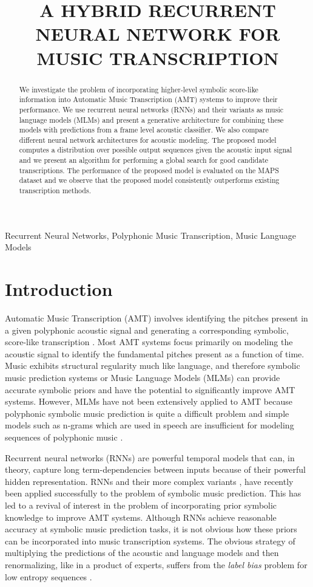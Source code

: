 \documentclass{article}
\title{A HYBRID RECURRENT NEURAL NETWORK FOR MUSIC TRANSCRIPTION}
\begin{document}
\ninept
%
\maketitle
%
\begin{abstract}
We investigate the problem of incorporating higher-level symbolic score-like information into Automatic Music Transcription (AMT) systems to improve their performance. We use recurrent neural networks (RNNs) and their variants as music language models (MLMs) and present a generative architecture for combining these models with predictions from a frame level acoustic classifier. We also compare different neural network architectures for acoustic modeling. The proposed model computes a distribution over possible output sequences given the acoustic input signal and we present an algorithm for performing a global search for good candidate transcriptions. The performance of the proposed model is evaluated on the MAPS dataset and we observe that the proposed model consistently outperforms existing transcription methods. 
\end{abstract}
%
\begin{keywords}
Recurrent Neural Networks, Polyphonic Music Transcription, Music Language Models
\end{keywords}
%
\section{Introduction}
\label{sec:intro} 

Automatic Music Transcription (AMT) involves identifying the pitches present in a given polyphonic acoustic signal and generating a corresponding symbolic, score-like transcription \cite{Klapuri06book}. Most AMT systems focus primarily on modeling the acoustic signal to identify the fundamental pitches present as a function of time. Music exhibits structural regularity much like language, and therefore symbolic music prediction systems or Music Language Models (MLMs) can provide accurate symbolic priors and have the potential to significantly improve AMT systems. However, MLMs have not been extensively applied to AMT because polyphonic symbolic music prediction is quite a difficult problem and simple models such as n-grams which are used in speech are insufficient for modeling sequences of polyphonic music \cite{boulanger2012modeling}. 

Recurrent neural networks (RNNs) are powerful temporal models that can, in theory, capture long term-dependencies between inputs because of their powerful hidden representation. RNNs and their more complex variants \cite{boulanger2012modeling}, have recently been applied successfully to the problem of symbolic music prediction. This has led to a revival of interest in the problem of incorporating prior symbolic knowledge to improve AMT systems. Although RNNs achieve reasonable accuracy at symbolic music prediction tasks, it is not obvious how these priors can be incorporated into music transcription systems. The obvious strategy of multiplying the predictions of the acoustic and language models and then renormalizing, like in a product of experts, suffers from the \emph{label bias} problem for low entropy sequences \cite{Lafferty:2001:CRF:645530.655813}. 
\end{document}
